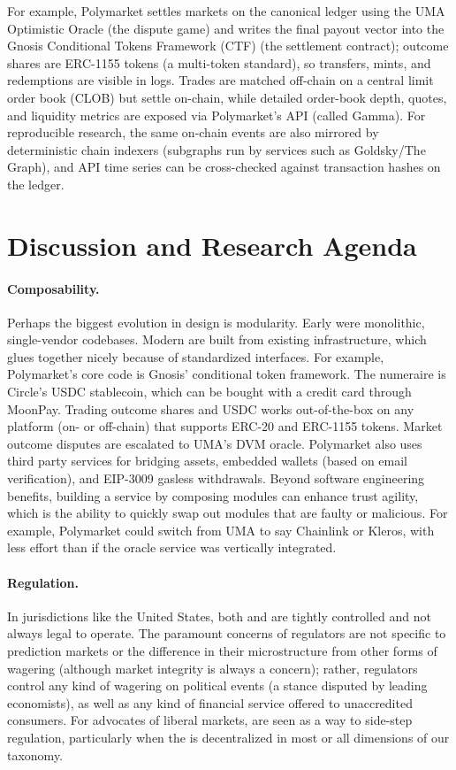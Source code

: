 For example, Polymarket settles markets on the canonical ledger using the UMA Optimistic Oracle (the dispute game) and writes the final payout vector into the Gnosis Conditional Tokens Framework (CTF) (the settlement contract); outcome shares are ERC-1155 tokens (a multi-token standard), so transfers, mints, and redemptions are visible in logs. Trades are matched off-chain on a central limit order book (CLOB) but settle on-chain, while detailed order-book depth, quotes, and liquidity metrics are exposed via Polymarket’s API (called Gamma). For reproducible research, the same on-chain events are also mirrored by deterministic chain indexers (subgraphs run by services such as Goldsky/The Graph), and API time series can be cross-checked against transaction hashes on the ledger.

\section{Discussion and Research Agenda}

\paragraph{Composability.} Perhaps the biggest evolution in \depm design is modularity. Early \depms were monolithic, single-vendor codebases. Modern \depms are built from existing infrastructure, which glues together nicely because of standardized interfaces. For example, Polymarket's core \depm code is Gnosis' conditional token framework. The numeraire is Circle's USDC stablecoin, which can be bought with a credit card through MoonPay. Trading outcome shares and USDC works out-of-the-box on any platform (on- or off-chain) that supports ERC-20 and ERC-1155 tokens. Market outcome disputes are escalated to UMA's DVM oracle. Polymarket also uses third party services for bridging assets, embedded wallets (based on email verification), and EIP-3009 gasless withdrawals. Beyond software engineering benefits, building a service by composing modules can enhance trust agility, which is the ability to quickly swap out modules that are faulty or malicious. For example, Polymarket could switch from UMA to say Chainlink or Kleros, with less effort than if the oracle service was vertically integrated. 



\paragraph{Regulation.} In jurisdictions like the United States, both \cepms and \depms are tightly controlled and not always legal to operate. The paramount concerns of regulators are not specific to prediction markets or the difference in their microstructure from other forms of wagering (although market integrity is always a concern); rather, regulators control any kind of wagering on political events (a stance disputed by leading economists), as well as any kind of financial service offered to unaccredited consumers. For advocates of liberal markets, \depms are seen as a way to side-step regulation, particularly when the \depm is decentralized in most or all dimensions of our taxonomy. 


